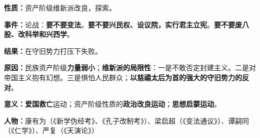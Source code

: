 {\textbf{{性质}：}{资产阶级维新派改良}，探索。}

{\textbf{{事件}：}论战：\textbf{{要不要变法}}。\textbf{{要不要兴民权、设议院，实行君主立宪}}。\textbf{{要不要废八股、改科举和兴西学}}。}

{\textbf{{结果}：}在守旧势力打压下失败。}

{\textbf{{原因}：}民族资产阶级\textbf{{力量弱小}}；\textbf{{维新派的局限性}}：{一是不敢否定封建主义。二是对帝国主义抱有幻想。三是惧怕人民群众}；\textbf{{以慈禧太后为首的强大的守旧势力的反对}}。}

{\textbf{{意义}：{爱国救亡}}运动；资产阶级性质的\textbf{{政治改良运动}}；\textbf{{思想启蒙运动}}。}

{\textbf{{人物}：}{康有为（《新学伪经考》、《孔子改制考》）、梁启超（《变法通议》）、谭嗣同（《仁学》）、严复（《天演论》）}}
